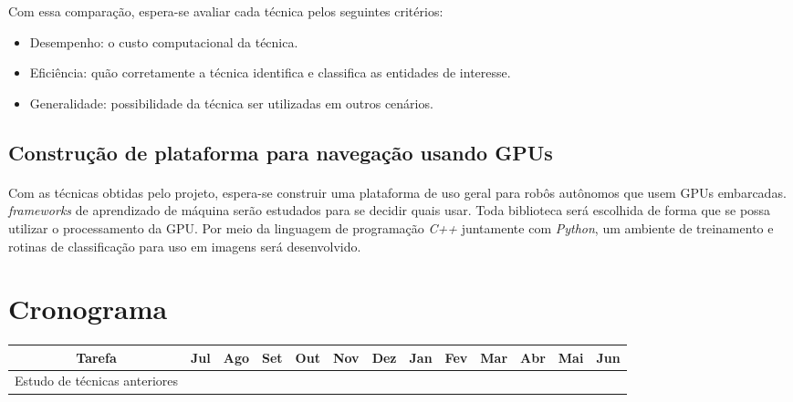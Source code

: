 \documentclass[10pt]{article}
\newcommand{\tit}[1]{\textit{#1}}
\begin{document}
Com essa comparação, espera-se avaliar cada técnica pelos seguintes critérios:
\begin{itemize}
	\item Desempenho: o custo computacional da técnica.
	\item Eficiência: quão corretamente a técnica identifica e classifica
		as entidades de interesse.
	\item Generalidade: possibilidade da técnica ser utilizadas em outros 
		cenários.
\end{itemize}

\subsection{Construção de plataforma para navegação usando GPUs}
\paragraph{}
Com as técnicas obtidas pelo projeto, espera-se construir uma plataforma
de uso geral para robôs autônomos que usem GPUs embarcadas.
\tit{frameworks} de aprendizado de máquina serão estudados para se decidir
quais usar. 
Toda biblioteca será escolhida de forma que se possa utilizar o processamento
da GPU.
Por meio da linguagem de programação \tit{C++} juntamente com \tit{Python},  
um ambiente de treinamento e rotinas de classificação para uso em imagens
será desenvolvido.

\section{Cronograma}
\paragraph{}
\begin{table}[H]
\centering
\begin{tabular}{|c|c|c|c|c|c|c|c|c|c|c|c|c|}
	\hline
	Tarefa & Jul & Ago & Set & Out & Nov & Dez & Jan & Fev & Mar & Abr & Mai & 
	Jun \\
	\hline
	Estudo de técnicas anteriores & & & & & & & & & & & & \\
	\hline
\end{tabular}
\end{table}

\printbibliography
\end{document}
